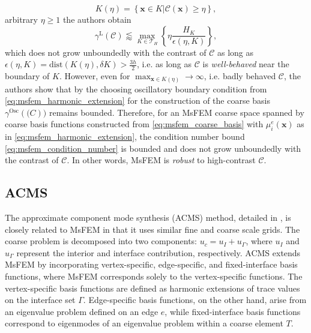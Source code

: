\[
    K(\eta) = \left\{\mathbf{x} \in K | \mathcal{C}(\mathbf{x}) \geq \eta\right\},
\]
arbitrary $\eta\geq 1$ the authors obtain \cite[Theorem 4.3]{msfem_coarse_space_Graham_2007}
\[
    \gamma^{\text{L}}(\mathcal{C}) \lessapprox \max_{K\in\mathcal{T}_H} \left\{\eta\frac{H_K}{\epsilon(\eta,K)}\right\},
\]
which does not grow unboundedly with the contrast of $\mathcal{C}$ as long as $\epsilon(\eta,K) = \text{dist}(K(\eta),\delta K) > \frac{3h}{2}$, i.e. as long as $\mathcal{C}$ is \textit{well-behaved} near the boundary of $K$. However, even for $\max_{\mathbf{x}\in K(\eta)} \rightarrow \infty$, i.e. badly behaved $\mathcal{C}$, the authors show that by the choosing oscillatory boundary condition from \cref{eq:msfem_harmonic_extension} for the construction of the coarse basis $\gamma^{\text{Osc}}(\mathcal(C))$ remains bounded. Therefore, for an MsFEM coarse space spanned by coarse basis functions constructed from \cref{eq:msfem_coarse_basis} with $\mu^e_i(\mathbf{x})$ as in \cref{eq:msfem_harmonic_extension}, the condition number bound \cref{eq:msfem_condition_number} is bounded and does not grow unboundedly with the contrast of $\mathcal{C}$. In other words, MsFEM is \textit{robust} to high-contrast $\mathcal{C}$.

\subsection{ACMS}
The approximate component mode synthesis (ACMS) method, detailed in \cite{acms_coarse_space_Heinlein2018}, is closely related to MsFEM in that it uses similar fine and coarse scale grids. The coarse problem is decomposed into two components: $u_c = u_I + u_{\Gamma}$, where $u_I$ and $u_{\Gamma}$ represent the interior and interface contribution, respectively. ACMS extends MsFEM by incorporating vertex-specific, edge-specific, and fixed-interface basis functions, where MsFEM corresponds solely to the vertex-specific functions. The vertex-specific basis functions are defined as harmonic extensions of trace values on the interface set $\Gamma$. Edge-specific basis functions, on the other hand, arise from an eigenvalue problem defined on an edge $e$, while fixed-interface basis functions correspond to eigenmodes of an eigenvalue problem within a coarse element $T$.
    
